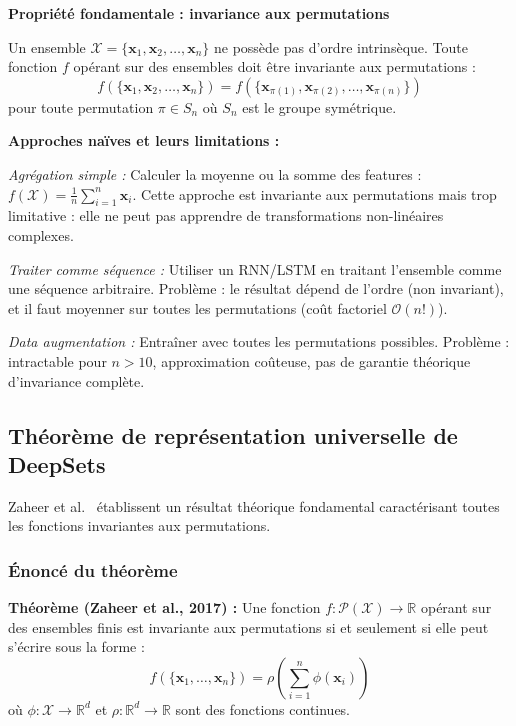 \textbf{Propriété fondamentale : invariance aux permutations}

Un ensemble $\mathcal{X} = \{\mathbf{x}_1, \mathbf{x}_2, \ldots, \mathbf{x}_n\}$ ne possède pas d'ordre intrinsèque. Toute fonction $f$ opérant sur des ensembles doit être invariante aux permutations :
\[
f(\{\mathbf{x}_1, \mathbf{x}_2, \ldots, \mathbf{x}_n\}) = f(\{\mathbf{x}_{\pi(1)}, \mathbf{x}_{\pi(2)}, \ldots, \mathbf{x}_{\pi(n)}\})
\]
pour toute permutation $\pi \in S_n$ où $S_n$ est le groupe symétrique.

\textbf{Approches naïves et leurs limitations :}

\textit{Agrégation simple :}
Calculer la moyenne ou la somme des features : $f(\mathcal{X}) = \frac{1}{n}\sum_{i=1}^n \mathbf{x}_i$. Cette approche est invariante aux permutations mais trop limitative : elle ne peut pas apprendre de transformations non-linéaires complexes.

\textit{Traiter comme séquence :}
Utiliser un RNN/LSTM en traitant l'ensemble comme une séquence arbitraire. Problème : le résultat dépend de l'ordre (non invariant), et il faut moyenner sur toutes les permutations (coût factoriel $\mathcal{O}(n!)$).

\textit{Data augmentation :}
Entraîner avec toutes les permutations possibles. Problème : intractable pour $n > 10$, approximation coûteuse, pas de garantie théorique d'invariance complète.

\subsection{Théorème de représentation universelle de DeepSets}

Zaheer et al.~\cite{Zaheer2017} établissent un résultat théorique fondamental caractérisant toutes les fonctions invariantes aux permutations.

\subsubsection{Énoncé du théorème}

\textbf{Théorème (Zaheer et al., 2017) :}
Une fonction $f: \mathcal{P}(\mathcal{X}) \to \mathbb{R}$ opérant sur des ensembles finis est invariante aux permutations si et seulement si elle peut s'écrire sous la forme :
\[
f(\{\mathbf{x}_1, \ldots, \mathbf{x}_n\}) = \rho\left(\sum_{i=1}^n \phi(\mathbf{x}_i)\right)
\]
où $\phi: \mathcal{X} \to \mathbb{R}^d$ et $\rho: \mathbb{R}^d \to \mathbb{R}$ sont des fonctions continues.

